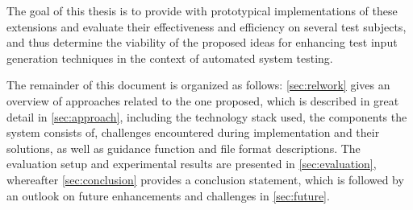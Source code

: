 The goal of this thesis is to provide \xmlmate with prototypical implementations of these extensions and
evaluate their effectiveness and efficiency on several test subjects, and thus determine the viability of the
proposed ideas for enhancing test input generation techniques in the context of automated system testing.

The remainder of this document is organized as follows: \cref{sec:relwork} gives an overview of approaches
related to the one proposed, which is described in great detail in \cref{sec:approach}, including the
technology stack used, the components the system consists of, challenges encountered during implementation and
their solutions, as well as guidance function and file format descriptions. The evaluation setup and
experimental results are presented in \cref{sec:evaluation}, whereafter \cref{sec:conclusion} provides a
conclusion statement, which is followed by an outlook on future enhancements and challenges in
\cref{sec:future}.
